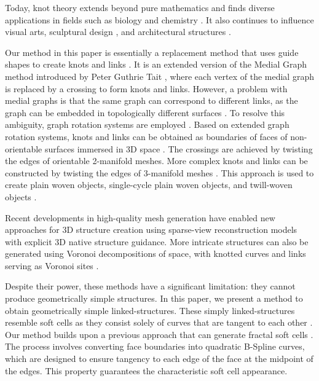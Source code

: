 \documentclass[times,twocolumn,final]{elsarticle}
\begin{document}
Today, knot theory extends beyond pure mathematics and finds diverse applications in fields such as biology and chemistry \cite{zhang1994dnatroctahedron,moestopo2023knots,fielden2017molecular,craik2001cystine,horner2016knot,forgan2011chemical}. It also continues to influence visual arts, sculptural design \cite{verhoeff2011chainlinkfence,holden2016braids,sequin2021polyhedral,lipschutz2022linkedknots}, and architectural structures \cite{kozlov2013structures,borhani2016emergence,borhani2016material,kozlov2018knots}.

Our method in this paper is essentially a replacement method that uses guide shapes to create knots and links \cite{roelofs2007rings,sequin2021polyhedral,gailiunas2022tplinks}. It is an extended version of the Medial Graph method introduced by Peter Guthrie Tait \cite{tait1877links,tait1877knots}, where each vertex of the medial graph is replaced by a crossing to form knots and links. However, a problem with medial graphs is that the same graph can correspond to different links, as the graph can be embedded in topologically different surfaces \cite{gross2001topological}. To resolve this ambiguity, graph rotation systems are employed \cite{gross2020enumerating,akleman1999guaranteeing}. Based on extended graph rotation systems, knots and links can be obtained as boundaries of faces of non-orientable surfaces immersed in 3D space \cite{akleman2020topologically,akleman2015extended}. The crossings are achieved by twisting the edges of orientable 2-manifold meshes. More complex knots and links can be constructed by twisting the edges of 3-manifold meshes \cite{akleman2015block}. This approach is used to create plain woven objects, single-cycle plain woven objects, and twill-woven objects \cite{akleman2009cyclic,xing2010single,akleman2011cyclic}.

Recent developments in high-quality mesh generation \cite{liu2024meshformer} have enabled new approaches for 3D structure creation using sparse-view reconstruction models with explicit 3D native structure guidance. More intricate structures can also be generated using Voronoi decompositions of space, with knotted curves and links serving as Voronoi sites \cite{krishnamurthy2020bi,krishnamurthy2021geometrically,yildiz2023modular,yildiz2024volumetric}.

Despite their power, these methods have a significant limitation: they cannot produce geometrically simple structures. In this paper, we present a method to obtain geometrically simple linked-structures. These simply linked-structures resemble soft cells as they consist solely of curves that are tangent to each other \cite{domokos2024soft}. Our method builds upon a previous approach that can generate fractal soft cells \cite{akleman2004smooth}. The process involves converting face boundaries into quadratic B-Spline curves, which are designed to ensure tangency to each edge of the face at the midpoint of the edges. This property guarantees the characteristic soft cell appearance.
\end{document}

